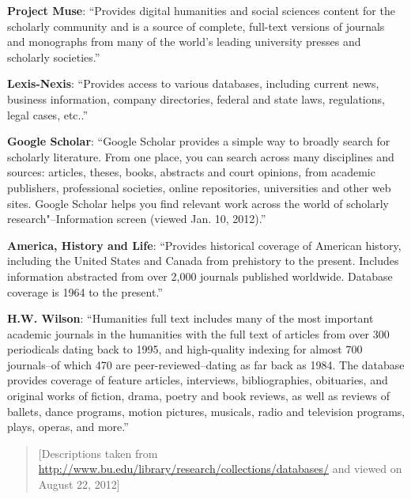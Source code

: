 \textbf{Project Muse}: ``Provides digital humanities and social sciences content for the scholarly community and is a source of complete, full-text versions of journals and monographs from many of the world's leading university presses and scholarly societies.''

\textbf{Lexis-Nexis}: ``Provides access to various databases, including current news, business information, company directories, federal and state laws, regulations, legal cases, etc..''

\textbf{Google Scholar}: ``Google Scholar provides a simple way to broadly search for scholarly literature. From one place, you can search across many disciplines and sources: articles, theses, books, abstracts and court opinions, from academic publishers, professional societies, online repositories, universities and other web sites. Google Scholar helps you find relevant work across the world of scholarly research"--Information screen (viewed Jan. 10, 2012).''

\textbf{America, History and Life}: ``Provides historical coverage of American history, including the United States and Canada from prehistory to the present. Includes information abstracted from over 2,000 journals published worldwide. Database coverage is 1964 to the present.''

\textbf{H.W. Wilson}: ``Humanities full text includes many of the most important academic journals in the humanities with the full text of articles from over 300 periodicals dating back to 1995, and high-quality indexing for almost 700 journals--of which 470 are peer-reviewed--dating as far back as 1984. The database provides coverage of feature articles, interviews, bibliographies, obituaries, and original works of fiction, drama, poetry and book reviews, as well as reviews of ballets, dance programs, motion pictures, musicals, radio and television programs, plays, operas, and more.''


\begin{quote}
[Descriptions taken from \url{http://www.bu.edu/library/research/collections/databases/} and viewed on August 22, 2012]
\end{quote}
